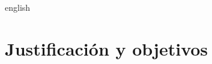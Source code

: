 \begin{hyphenrules}{english}
\section*{Justificación y objetivos}\label{sec:objectives}

\end{hyphenrules}
